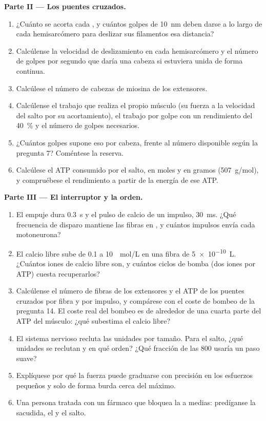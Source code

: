 \begin{problem}
\medskip
\noindent\textbf{Parte II --- Los puentes cruzados.}
\begin{enumerate}[resume]
  \item ¿Cuánto se acorta cada , y cuántos golpes de
        \qty{10}{nm} deben darse a lo largo de cada hemisarcómero para
        deslizar sus filamentos esa distancia?
  \item Calcúlense la velocidad de deslizamiento en cada hemisarcómero y el
        número de golpes por segundo que daría una cabeza si estuviera
        unida de forma continua.
  \item Calcúlese el número de cabezas de miosina de los extensores.
  \item Calcúlense el trabajo que realiza el propio músculo (su fuerza a la
        velocidad del salto por su acortamiento), el trabajo por golpe con
        un rendimiento del \qty{40}{\%} y el número de golpes necesarios.
  \item ¿Cuántos golpes supone eso por cabeza, frente al número disponible
        según la pregunta 7? Coméntese la reserva.
  \item Calcúlese el ATP consumido por el salto, en moles y en gramos
        (\qty{507}{g/mol}), y compruébese el rendimiento a partir de la
        energía de ese ATP.
\end{enumerate}

\medskip
\noindent\textbf{Parte III --- El interruptor y la orden.}
\begin{enumerate}[resume]
  \item El empuje dura \qty{0.3}{s} y el pulso de calcio de un impulso,
        \qty{30}{ms}. ¿Qué frecuencia de disparo mantiene las
        fibras en , y cuántos impulsos envía cada motoneurona?
  \item El calcio libre sube de \qty{0.1}{} a \qty{10}{\micro
        mol/L} en una fibra de \qty{5e-10}{L}. ¿Cuántos iones de calcio
        libre son, y cuántos ciclos de bomba (dos iones por ATP) cuesta
        recuperarlos?
  \item Calcúlense el número de fibras de los extensores y el ATP de los
        puentes cruzados por fibra y por impulso, y compárese con el coste
        de bombeo de la pregunta 14. El coste real del bombeo es de
        alrededor de una cuarta parte del ATP del músculo: ¿qué subestima
        el calcio libre?
  \item El sistema nervioso recluta las unidades por tamaño. Para el salto,
        ¿qué unidades se reclutan y en qué orden? ¿Qué fracción de las
        \num{800} usaría un paso suave?
  \item Explíquese por qué la fuerza puede graduarse con precisión en los
        esfuerzos pequeños y solo de forma burda cerca del máximo.
  \item Una persona tratada con un fármaco que bloquea la  a medias: predíganse la sacudida, el  y el
        salto.
\end{enumerate}


\end{problem}
